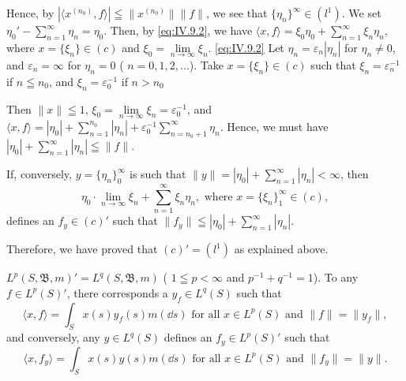 Hence, by $|\langle x^{(n_0)}, f \rangle| \leqq \|x^{(n_0)}\| \|f\|$, we see that $\{\eta_n\}^\infty \in (l^1)$. We set $\eta_0' - \sum\limits_{n=1}^\infty \eta_n = \eta_0$. Then, by \eqref{eq:IV.9.2}, we have 
$\langle x, f \rangle = \xi_0 \eta_0 + \sum\limits_{n=1}^{\infty} \xi_n \eta_n$, where $x = \{\xi_n\} \in (c)$ and $\xi_0 = \lim\limits_{n \to \infty} \xi_n$. \eqref{eq:IV.9.2} Let $\eta_n = \varepsilon_n | \eta_n|$ for $\eta_n \neq 0$, and $\varepsilon_n = \infty$ for $\eta_n = 0$ ( $n = 0, 1, 2, \ldots$). Take $x = \{\xi_n\} \in (c)$ such that 
$\xi_{n} = \varepsilon_{n}^{-1}$ if $n\leqq n_0$, and $\xi_{n} = \varepsilon_{0}^{-1}$ if $n > n_0$ 

Then $\|x\| \leqq 1$, $\xi_0 = \lim\limits_{n \to \infty} \xi_n = \varepsilon_0^{-1}$, and $\langle x, f \rangle = |\eta_0| + \sum\limits_{n=1}^{n_0} |\eta_n| + \varepsilon_0^{-1} \sum\limits_{n=n_0+1}^{\infty} \eta_n$. Hence, we must have $|\eta_0| + \sum\limits_{n=1}^{\infty} |\eta_n| \leqq \|f\|$. 

If, conversely, $y = \{\eta_n\}_0^\infty$ is such that $\|y\| = |\eta_0| + \sum\limits_{n=1}^{\infty} |\eta_n| < \infty$, then 
\[
\eta_{0} \cdot \lim\limits _{n \rightarrow \infty} \xi_{n} + \sum\limits_{n=1} ^{\infty} \xi_{n} \eta_{n}, \text{ where } x = \{\xi_{n} \} _{1} ^{\infty} \in (c),
\]
defines an $f_y \in (c)'$ such that $\|f_y\| \leqq |\eta_0| + \sum\limits_{n=1}^{\infty} |\eta_n|$. 

Therefore, we have proved that $(c)' = (l^1)$ as explained above. 

\begin{example}\label{ex:IV.9.Example.3} $L^p(S, \mathfrak{B}, m)' = L^q(S, \mathfrak{B}, m)$ ( $1 \leqq p < \infty$ and $p^{-1} + q^{-1} = 1$). To any $f \in L^p(S)'$, there corresponds a $y_f \in L^q(S)$ such that 
\begin{equation}\label{eq:IV.9.3}
\langle x, f \rangle = \int_{S} x (s) y _{f} (s) m (\dd s) \text{ for all } x \in L ^{p} (S) \text{ and } \| f \| = \| y _{f} \|,
\end{equation}
and conversely, any $y \in L^{q}(S)$ defines an $f_{y} \in L^{p}(S)'$ such that 
\begin{equation}\tag{3'}\label{eq:IV.9.3'}
\langle x, f _{y} \rangle = \int_{S} x (s) y (s) m (\dd s) \text{ for all } x \in L ^{p} (S) \text{ and } \| f _{y} \| = \| y \|.
\end{equation}
\end{example}


